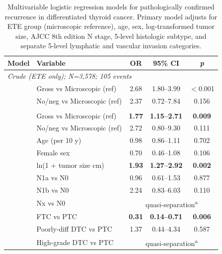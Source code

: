 

\begin{table}[htbp]
\centering
\caption{Multivariable logistic regression models for pathologically confirmed recurrence in differentiated thyroid cancer. Primary model adjusts for ETE group (microscopic reference), age, sex, log-transformed tumor size, AJCC 8th edition N stage, 5-level histologic subtype, and separate 5-level lymphatic and vascular invasion categories.}
\label{tab:regression}
\small
\begin{tabular}{@{}llccc@{}}
\toprule
\textbf{Model} & \textbf{Variable} & \textbf{OR} & \textbf{95\% CI} & \textbf{\textit{p}} \\
\midrule
\multicolumn{5}{l}{\textit{Crude (ETE only); N=3{,}578; 105 events}} \\
 & Gross vs Microscopic (ref) & 2.68 & 1.80--3.99 & $<$0.001 \\
 & No/neg vs Microscopic (ref) & 2.37 & 0.72--7.84 & 0.156 \\
\addlinespace
\multicolumn{5}{l}{\textit{Primary (no RAI); N=3{,}572; 105 events}} \\
 & Gross vs Microscopic (ref) & \textbf{1.77} & \textbf{1.15--2.71} & \textbf{0.009} \\
 & No/neg vs Microscopic (ref) & 2.72 & 0.80--9.30 & 0.111 \\
 & Age (per 10 y) & 0.98 & 0.86--1.11 & 0.702 \\
 & Female sex & 0.70 & 0.46--1.08 & 0.106 \\
 & ln(1 + tumor size cm) & \textbf{1.93} & \textbf{1.27--2.92} & \textbf{0.002} \\
 & N1a vs N0 & 0.96 & 0.61--1.53 & 0.877 \\
 & N1b vs N0 & 2.24 & 0.83--6.03 & 0.110 \\
 & Nx vs N0 & \multicolumn{3}{c}{quasi-separation\textsuperscript{a}} \\
 & FTC vs PTC & \textbf{0.31} & \textbf{0.14--0.71} & \textbf{0.006} \\
 & Poorly-diff DTC vs PTC & 1.37 & 0.44--4.34 & 0.587 \\
 & High-grade DTC vs PTC & \multicolumn{3}{c}{quasi-separation\textsuperscript{a}} \\

\end{tabular}
\end{table}

